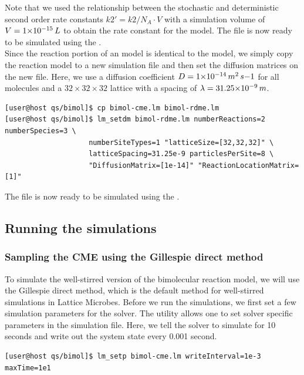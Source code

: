 Note that we used the relationship between the stochastic and deterministic second order rate constants $k2'=k2/N_A{\cdot}V$ with a simulation volume of $V=1{\times}10^{-15}\,L$ to obtain the rate constant for the model. The file  is now ready to be simulated using the .\\

Since the reaction portion of an  model is identical to the  model, we simply copy the reaction model to a new simulation file and then set the diffusion matrices on the new file. Here, we use a diffusion coefficient $D=1{\times}10^{-14}\,m^2\,s{-1}$ for all molecules and a $32{\times}32{\times}32$ lattice with a spacing of $\lambda=31.25{\times}10^{-9}\,m$.
{\small\begin{verbatim}
[user@host qs/bimol]$ cp bimol-cme.lm bimol-rdme.lm
[user@host qs/bimol]$ lm_setdm bimol-rdme.lm numberReactions=2 numberSpecies=3 \
                    numberSiteTypes=1 "latticeSize=[32,32,32]" \
                    latticeSpacing=31.25e-9 particlesPerSite=8 \
                    "DiffusionMatrix=[1e-14]" "ReactionLocationMatrix=[1]"
\end{verbatim}}

The file \file{bimol-rdme.lm} is now ready to be simulated using the .

\subsection{Running the simulations}

\subsubsection{Sampling the CME using the Gillespie direct method}

To simulate the well-stirred version of the bimolecular reaction model, we will use the Gillespie direct method, which is the default method for well-stirred simulations in Lattice Microbes. Before we run the simulations, we first set a few simulation parameters for the solver. The  utility allows one to set solver specific parameters in the simulation file. Here, we tell the solver to simulate for 10 seconds and write out the system state every 0.001 second.
{\small\begin{verbatim}
[user@host qs/bimol]$ lm_setp bimol-cme.lm writeInterval=1e-3 maxTime=1e1
\end{verbatim}}


